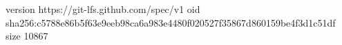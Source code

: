version https://git-lfs.github.com/spec/v1
oid sha256:c5788e86b5f63e9eeb98ca6a983e4480f020527f35867d860159be4f3d1c51df
size 10867

